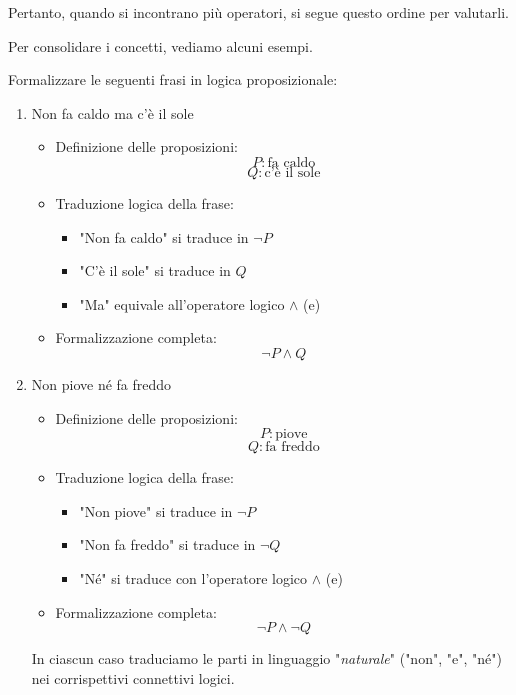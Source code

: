 Pertanto, quando si incontrano più operatori, si segue questo ordine per valutarli.



\medskip 
Per consolidare i concetti, vediamo alcuni esempi.
\begin{esempio}
Formalizzare le seguenti frasi in logica proposizionale:

   \begin{enumerate}[label=\alph*)]

        \item Non fa caldo ma c'è il sole
        \begin{itemize}
            \item Definizione delle proposizioni:
            \[
            P: \text{fa caldo}
            \]
            \[
            Q: \text{c'è il sole}
            \]
            
            \item Traduzione logica della frase:
            \begin{itemize}
                \item "Non fa caldo" si traduce in \( \neg P \)
                \item "C'è il sole" si traduce in \( Q \)
                \item "Ma" equivale all'operatore logico \( \land \) (e)
            \end{itemize}
            
            \item Formalizzazione completa:
            \[
            \neg P \land Q
            \]
        \end{itemize}

        \item Non piove né fa freddo
        \begin{itemize}
            \item Definizione delle proposizioni:
            \[
            P: \text{piove}
            \]
            \[
            Q: \text{fa freddo}
            \]
            
            \item Traduzione logica della frase:
            \begin{itemize}
                \item "Non piove" si traduce in \( \neg P \)
                \item "Non fa freddo" si traduce in \( \neg Q \)
                \item "Né" si traduce con l'operatore logico \( \land \) (e)
            \end{itemize}
            
            \item Formalizzazione completa:
            \[
            \neg P \land \neg Q
            \]
        \end{itemize}
    \medskip In ciascun caso traduciamo le parti in linguaggio "\textit{naturale}" ("non", "e", "né") nei corrispettivi connettivi logici. 
\end{enumerate}

 
\end{esempio}


